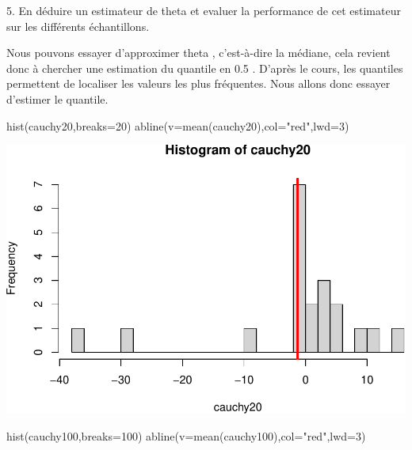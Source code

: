 \documentclass[
]{article}
\newenvironment{Shaded}{\begin{snugshade}}{\end{snugshade}}
\newcommand{\AttributeTok}[1]{\textcolor[rgb]{0.77,0.63,0.00}{#1}}
\newcommand{\DecValTok}[1]{\textcolor[rgb]{0.00,0.00,0.81}{#1}}
\newcommand{\FunctionTok}[1]{\textcolor[rgb]{0.00,0.00,0.00}{#1}}
\newcommand{\NormalTok}[1]{#1}
\newcommand{\StringTok}[1]{\textcolor[rgb]{0.31,0.60,0.02}{#1}}
\begin{document}
5. En déduire un estimateur de theta et evaluer la performance de cet
estimateur sur les différents échantillons.

Nous pouvons essayer d'approximer theta , c'est-à-dire la médiane, cela
revient donc à chercher une estimation du quantile en 0.5 . D'après le
cours, les quantiles permettent de localiser les valeurs les plus
fréquentes. Nous allons donc essayer d'estimer le quantile.

\begin{Shaded}
\begin{Highlighting}[]
\FunctionTok{hist}\NormalTok{(cauchy20,}\AttributeTok{breaks=}\DecValTok{20}\NormalTok{)}
\FunctionTok{abline}\NormalTok{(}\AttributeTok{v=}\FunctionTok{mean}\NormalTok{(cauchy20),}\AttributeTok{col=}\StringTok{"red"}\NormalTok{,}\AttributeTok{lwd=}\DecValTok{3}\NormalTok{)}
\end{Highlighting}
\end{Shaded}

\includegraphics{tp2_files/figure-latex/unnamed-chunk-9-1.pdf}

\begin{Shaded}
\begin{Highlighting}[]
\FunctionTok{hist}\NormalTok{(cauchy100,}\AttributeTok{breaks=}\DecValTok{100}\NormalTok{)}
\FunctionTok{abline}\NormalTok{(}\AttributeTok{v=}\FunctionTok{mean}\NormalTok{(cauchy100),}\AttributeTok{col=}\StringTok{"red"}\NormalTok{,}\AttributeTok{lwd=}\DecValTok{3}\NormalTok{)}
\end{Highlighting}
\end{Shaded}
\end{document}
